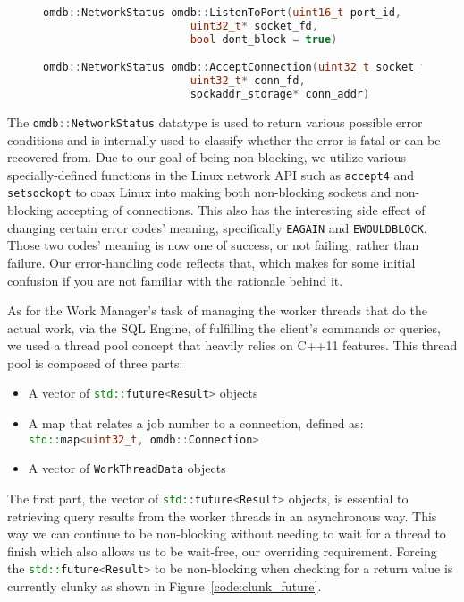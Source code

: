 \documentclass[letterpaper, 12pt]{article}
\newcommand{\inlinecode}[1]{\colorbox{codegrey}{\lstinline[language=C++]{#1}}}
\begin{document}
  \begin{figure}
  \label{code:work_manager_func_def}
  \begin{lstlisting}[language=C++]
omdb::NetworkStatus omdb::ListenToPort(uint16_t port_id,
				       uint32_t* socket_fd,
				       bool dont_block = true)

omdb::NetworkStatus omdb::AcceptConnection(uint32_t socket_fd,
					   uint32_t* conn_fd,
					   sockaddr_storage* conn_addr)
  \end{lstlisting}
  \end{figure}
  The \inlinecode{omdb::NetworkStatus} datatype is used to return various
  possible error conditions and is internally used to classify whether the error is fatal
  or can be recovered from. Due to our goal of being non-blocking, we utilize various specially-defined
  functions in the Linux network API such as \inlinecode{accept4} and
  \inlinecode{setsockopt} to coax Linux into making both non-blocking
  sockets and non-blocking accepting of connections. This also has the interesting side effect of
  changing certain error codes' meaning, specifically \inlinecode{EAGAIN} and
  \inlinecode{EWOULDBLOCK}. Those two codes' meaning is now one of success, or not
  failing, rather than failure. Our error-handling code reflects that, which makes for some initial
  confusion if you are not familiar with the rationale behind it.
  \par\vspace{\baselineskip}
  As for the Work Manager's task of managing the worker threads that do the actual work, via the
  SQL Engine, of fulfilling the client's commands or queries, we used a thread pool concept that
  heavily relies on C++11 features. This thread pool is composed of three parts:
  \begin{itemize}
   \item A vector of \inlinecode{std::future<Result>} objects
   \item A map that relates a job number to a connection, defined as:\\
	 \inlinecode{std::map<uint32_t, omdb::Connection>}
   \item A vector of \inlinecode{WorkThreadData} objects
  \end{itemize}
  The first part, the vector of \inlinecode{std::future<Result>} objects, is
  essential to retrieving query results from the worker threads in an asynchronous way. This way
  we can continue to be non-blocking without needing to wait for a thread to finish which also
  allows us to be wait-free, our overriding requirement. Forcing the \inlinecode{std::future<Result>}
  to be non-blocking when checking for a return value is currently clunky as shown in Figure~\ref{code:clunk_future}.
  \par\vspace{\baselineskip}
  
\end{document}
